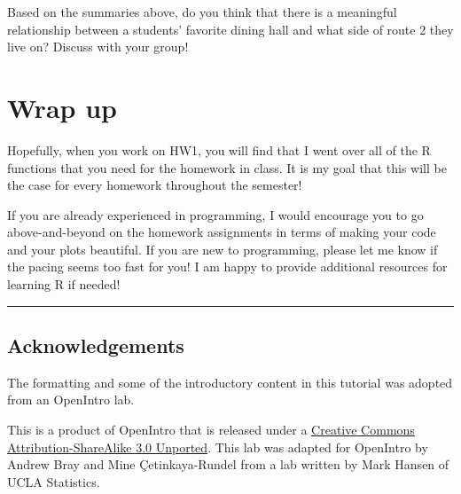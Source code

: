 \documentclass[
]{article}
\begin{document}
Based on the summaries above, do you think that there is a meaningful
relationship between a students' favorite dining hall and what side of
route 2 they live on? Discuss with your group!

\section{Wrap up}\label{wrap-up}

Hopefully, when you work on HW1, you will find that I went over all of
the R functions that you need for the homework in class. It is my goal
that this will be the case for every homework throughout the semester!

If you are already experienced in programming, I would encourage you to
go above-and-beyond on the homework assignments in terms of making your
code and your plots beautiful. If you are new to programming, please let
me know if the pacing seems too fast for you! I am happy to provide
additional resources for learning R if needed!

\begin{center}\rule{0.5\linewidth}{0.5pt}\end{center}

\subsection{Acknowledgements}\label{acknowledgements}

The formatting and some of the introductory content in this tutorial was
adopted from an OpenIntro lab.

\label{license}
This is a product of OpenIntro that is released under a
\href{http://creativecommons.org/licenses/by-sa/3.0}{Creative Commons
Attribution-ShareAlike 3.0 Unported}. This lab was adapted for OpenIntro
by Andrew Bray and Mine Çetinkaya-Rundel from a lab written by Mark
Hansen of UCLA Statistics.
\end{document}
